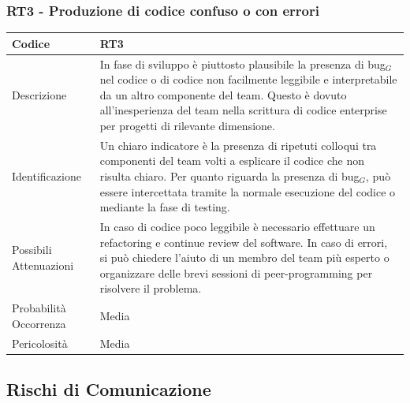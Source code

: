 \documentclass[10pt]{article}
\begin{document}
{    \subsubsection{RT3 - Produzione di codice confuso o con errori}
    \label{RT3}
    \begin{tabularx}{\textwidth}{|l|X|}
    \hline
    \rowcolor{gray!25}
    Codice & RT3 \\
    \hline
    Descrizione & In fase di sviluppo è piuttosto plausibile la presenza di bug$_G$ nel codice o di codice non facilmente leggibile e interpretabile da un altro componente del team. Questo è dovuto all'inesperienza del team nella scrittura di codice enterprise per progetti di rilevante dimensione. \\
    \hline
    Identificazione & Un chiaro indicatore è la presenza di ripetuti colloqui tra componenti del team volti a esplicare il codice che non risulta chiaro. Per quanto riguarda la presenza di bug$_G$, può essere intercettata tramite la normale esecuzione del codice o mediante la fase di testing.   \\
    \hline
    Possibili Attenuazioni & In caso di codice poco leggibile è necessario effettuare un refactoring e continue review del software. In caso di errori, si può chiedere l'aiuto di un membro del team più esperto o organizzare delle brevi sessioni di peer-programming per risolvere il problema. \\
    \hline
    Probabilità Occorrenza &  Media \\
    \hline
    Pericolosità & Media \\ 
    \hline
    \end{tabularx}

\subsection{Rischi di Comunicazione}
}
\end{document}
